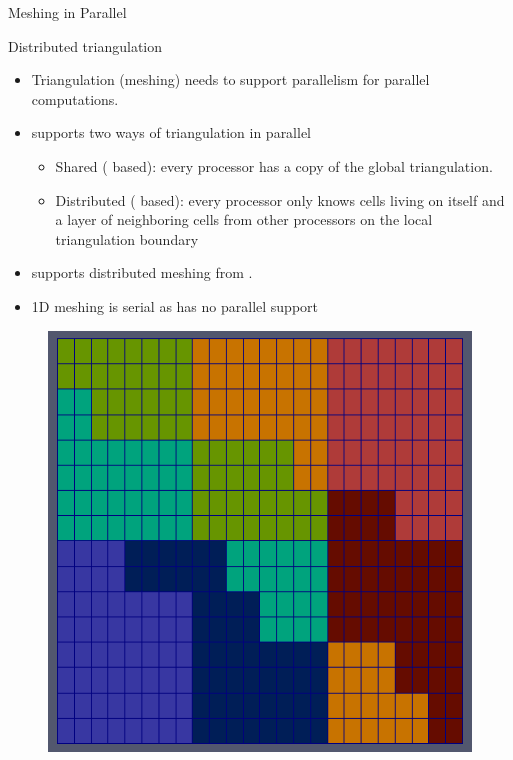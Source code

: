 \begin{frame}{Meshing in Parallel}
	\begin{block}{Distributed triangulation}
		\begin{itemize}
			\item Triangulation (meshing) needs to support parallelism for parallel computations.
			\item {} supports two ways of triangulation in parallel
			\begin{itemize}
				\item Shared ( based): every processor has a copy of the global triangulation.
				\item Distributed ( based): every processor only knows cells living on itself and a layer of neighboring cells from other processors on the local triangulation boundary
			\end{itemize}
			\item {} supports distributed meshing from .
			\item 1D meshing is serial as  has no parallel support
		\end{itemize}
	\end{block}
	\begin{figure}
		\includegraphics*[scale=0.25]{graphic/mesh/distributed-mesh}
		~

\end{figure}
\end{frame}
